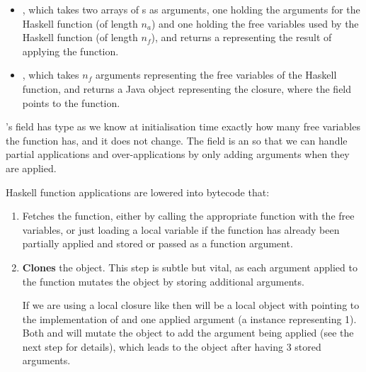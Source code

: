 \documentclass[dissertation.tex]{subfiles}
\begin{document}
{{{            \begin{itemize}
            \item
            {
                , which takes two arrays of s as arguments, one holding the arguments for the Haskell function (of length \(n_a\)) and one holding the free variables used by the Haskell function (of length \(n_f\)), and returns a  representing the result of applying the function.
            }
            \item
            {
                , which takes \(n_f\) arguments representing the free variables of the Haskell function, and returns a Java  object representing the closure, where the  field points to the  function.
            }
            \end{itemize}
            
            's  field has type  as we know at initialisation time exactly how many free variables the function has, and it does not change. The  field is an  so that we can handle partial applications and over-applications by only adding arguments when they are applied.

            Haskell function applications are lowered into bytecode that:
            \begin{enumerate}
            \item
            {
                Fetches the function, either by calling the appropriate  function with the free variables, or just loading a local variable if the function has already been partially applied and stored or passed as a function argument.
            }
            \item
            {
                \textbf{Clones} the  object. This step is subtle but vital, as each argument applied to the function mutates the  object by storing additional arguments.
                
                If we are using a local closure like  then  will be a local  object with  pointing to the implementation of \haskell{(+)} and one applied argument (a  instance representing 1). Both  and  will mutate the object to add the argument being applied (see the next step for details), which leads to the  object after  having 3 stored arguments.

}
\end{enumerate}}}}
\end{document}
